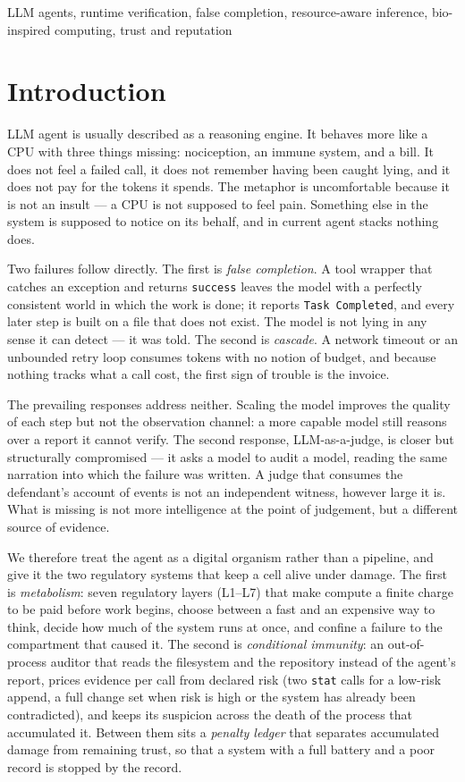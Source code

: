 \documentclass[conference]{IEEEtran}
\begin{document}
\begin{IEEEkeywords}
LLM agents, runtime verification, false completion, resource-aware inference,
bio-inspired computing, trust and reputation
\end{IEEEkeywords}

\section{Introduction}
 LLM agent is usually described as a reasoning engine. It
behaves more like a CPU with three things missing: nociception, an immune system,
and a bill. It does not feel a failed call, it does not remember having been
caught lying, and it does not pay for the tokens it spends. The metaphor is
uncomfortable because it is not an insult --- a CPU is not supposed to feel pain.
Something else in the system is supposed to notice on its behalf, and in current
agent stacks nothing does.

Two failures follow directly. The first is \emph{false completion}. A tool
wrapper that catches an exception and returns \texttt{success} leaves the model
with a perfectly consistent world in which the work is done; it reports
\texttt{Task Completed}, and every later step is built on a file that does not
exist. The model is not lying in any sense it can detect --- it was told. The
second is \emph{cascade}. A network timeout or an unbounded retry loop consumes
tokens with no notion of budget, and because nothing tracks what a call cost, the
first sign of trouble is the invoice.

The prevailing responses address neither. Scaling the model improves the quality
of each step but not the observation channel: a more capable model still reasons
over a report it cannot verify. The second response, LLM-as-a-judge, is closer
but structurally compromised --- it asks a model to audit a model, reading the
same narration into which the failure was written. A judge that consumes the
defendant's account of events is not an independent witness, however large it is.
What is missing is not more intelligence at the point of judgement, but a
different source of evidence.

We therefore treat the agent as a digital organism rather than a pipeline, and
give it the two regulatory systems that keep a cell alive under damage. The first
is \emph{metabolism}: seven regulatory layers (L1--L7) that make compute a finite
charge to be paid before work begins, choose between a fast and an expensive way
to think, decide how much of the system runs at once, and confine a failure to
the compartment that caused it. The second is \emph{conditional immunity}: an
out-of-process auditor that reads the filesystem and the repository instead of
the agent's report, prices evidence per call from declared risk (two
\texttt{stat} calls for a low-risk append, a full change set when risk is high or
the system has already been contradicted), and keeps its suspicion across the
death of the process that accumulated it. Between them sits a \emph{penalty
ledger} that separates accumulated damage from remaining trust, so that a system
with a full battery and a poor record is stopped by the record.
\end{document}
